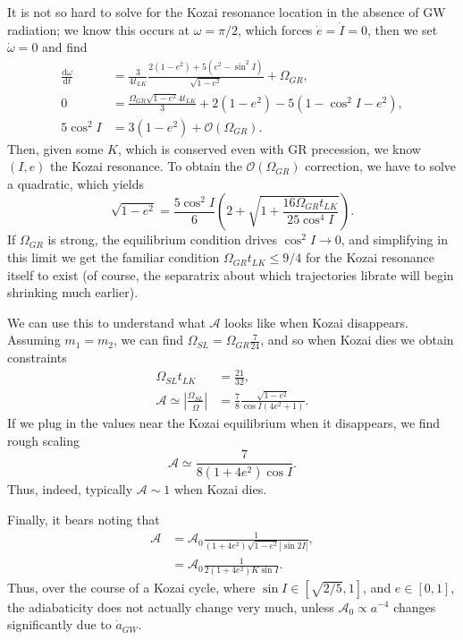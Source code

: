 \documentclass[11pt,
        usenames, %
        dvipsnames %
    ]{article}
\newcommand*{\rd}[2]{\frac{\mathrm{d}#1}{\mathrm{d}#2}}
\newcommand*{\abs}[1]{\left|#1\right|}
\newcommand*{\p}[1]{\left(#1\right)}
\begin{document}
It is not so hard to solve for the Kozai resonance location in the absence of GW
radiation; we know this occurs at $\omega = \pi/2$, which forces $\dot{e} =
\dot{I} = 0$, then we set $\dot{\omega} = 0$ and find
\begin{align}
    \rd{\omega}{t} &= \frac{3}{4t_{LK}} \frac{2(1 - e^2) + 5(e^2 - \sin^2 I)}{
            \sqrt{1 - e^2}} + \Omega_{GR},\\
    0 &= \frac{\Omega_{GR}\sqrt{1 - e^2}4t_{LK}}{3}
        + 2\p{1 - e^2} - 5\p{1 - \cos^2 I - e^2},\\
    5\cos^2 I &= 3\p{1 - e^2} + \mathcal{O}\p{\Omega_{GR}}.
\end{align}
Then, given some $K$, which is conserved even with GR precession, we know $(I,
e)$ the Kozai resonance. To obtain the $\mathcal{O}\p{\Omega_{GR}}$ correction,
we have to solve a quadratic, which yields
\begin{equation}
    \sqrt{1 - e^2} = \frac{5\cos^2I}{6}\p{2 +
        \sqrt{1 + \frac{16 \Omega_{GR}t_{LK}}{25 \cos^4 I}}}.
\end{equation}
If $\Omega_{GR}$ is strong, the equilibrium condition drives $\cos^2 I \to 0$,
and simplifying in this limit we get the familiar condition $\Omega_{GR}t_{LK}
\leq 9/4$ for the Kozai resonance itself to exist (of course, the separatrix
about which trajectories librate will begin shrinking much earlier).

We can use this to understand what $\mathcal{A}$ looks like when Kozai
disappears. Assuming $m_1 = m_2$, we can find $\Omega_{SL} =
\Omega_{GR}\frac{7}{24}$, and so when Kozai dies we obtain constraints
\begin{align}
    \Omega_{SL}t_{LK} &= \frac{21}{32},\\
    \mathcal{A} \simeq \abs{\frac{\Omega_{SL}}{\dot{\Omega}}}
        &= \frac{7}{8}\frac{\sqrt{1 - e^2}}{\cos I\p{4e^2 + 1}}.
\end{align}
If we plug in the values near the Kozai equilibrium when it disappears, we find
rough scaling
\begin{equation}
    \mathcal{A} \simeq \frac{7}{8\p{1 + 4e^2} \cos I}.
\end{equation}
Thus, indeed, typically $\mathcal{A} \sim 1$ when Kozai dies.

Finally, it bears noting that
\begin{align}
    \mathcal{A} &= \mathcal{A}_0 \frac{1}{\p{1 + 4e^2}
            \sqrt{1 - e^2}\abs{\sin 2I}} ,\\
        &= \mathcal{A}_0 \frac{1}{2\p{1 + 4e^2}K \sin I}.
\end{align}
Thus, over the course of a Kozai cycle, where $\sin I \in [\sqrt{2/5}, 1]$, and
$e \in [0, 1]$, the adiabaticity does not actually change very much, unless
$\mathcal{A}_0 \propto a^{-4}$ changes significantly due to $\dot{a}_{GW}$.
\end{document}
